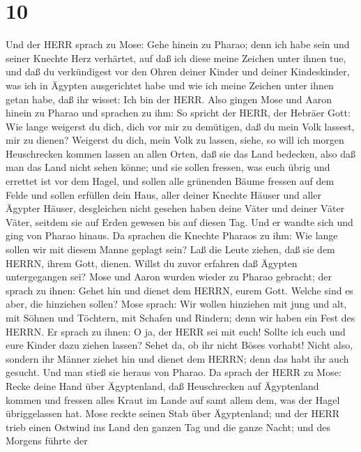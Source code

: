 \hypertarget{section-9}{%
\section{10}\label{section-9}}

 Und der HERR sprach zu Mose: Gehe hinein zu Pharao; denn
ich habe sein und seiner Knechte Herz verhärtet, auf daß ich diese meine
Zeichen unter ihnen tue,  und daß du verkündigest vor den
Ohren deiner Kinder und deiner Kindeskinder, was ich in Ägypten
ausgerichtet habe und wie ich meine Zeichen unter ihnen getan habe, daß
ihr wisset: Ich bin der HERR.  Also gingen Mose und Aaron
hinein zu Pharao und sprachen zu ihm: So spricht der HERR, der Hebräer
Gott: Wie lange weigerst du dich, dich vor mir zu demütigen, daß du mein
Volk lassest, mir zu dienen?  Weigerst du dich, mein Volk zu
lassen, siehe, so will ich morgen Heuschrecken kommen lassen an allen
Orten,  daß sie das Land bedecken, also daß man das Land
nicht sehen könne; und sie sollen fressen, was euch übrig und errettet
ist vor dem Hagel, und sollen alle grünenden Bäume fressen auf dem Felde
 und sollen erfüllen dein Haus, aller deiner Knechte Häuser
und aller Ägypter Häuser, desgleichen nicht gesehen haben deine Väter
und deiner Väter Väter, seitdem sie auf Erden gewesen bis auf diesen
Tag. Und er wandte sich und ging von Pharao hinaus.  Da
sprachen die Knechte Pharaos zu ihm: Wie lange sollen wir mit diesem
Manne geplagt sein? Laß die Leute ziehen, daß sie dem HERRN, ihrem Gott,
dienen. Willst du zuvor erfahren daß Ägypten untergegangen sei?
 Mose und Aaron wurden wieder zu Pharao gebracht; der sprach
zu ihnen: Gehet hin und dienet dem HERRN, eurem Gott. Welche sind es
aber, die hinziehen sollen?  Mose sprach: Wir wollen
hinziehen mit jung und alt, mit Söhnen und Töchtern, mit Schafen und
Rindern; denn wir haben ein Fest des HERRN.  Er sprach zu
ihnen: O ja, der HERR sei mit euch! Sollte ich euch und eure Kinder dazu
ziehen lassen? Sehet da, ob ihr nicht Böses vorhabt!  Nicht
also, sondern ihr Männer ziehet hin und dienet dem HERRN; denn das habt
ihr auch gesucht. Und man stieß sie heraus von Pharao.  Da
sprach der HERR zu Mose: Recke deine Hand über Ägyptenland, daß
Heuschrecken auf Ägyptenland kommen und fressen alles Kraut im Lande auf
samt allem dem, was der Hagel übriggelassen hat.  Mose
reckte seinen Stab über Ägyptenland; und der HERR trieb einen Ostwind
ins Land den ganzen Tag und die ganze Nacht; und des Morgens führte der
